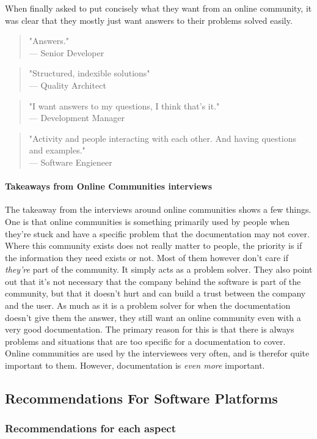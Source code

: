 \documentclass{article}
\begin{document}
When finally asked to put concisely what they want from an online community, it was clear that they mostly just want answers to their problems solved easily.
\begin{quote}
"Answers."\\
--- Senior Developer
\end{quote}
\begin{quote}
"Structured, indexible solutions"\\ --- Quality Architect
\end{quote}
\begin{quote}
"I want answers to my questions, I think that's it." \\ --- Development Manager
\end{quote}
\begin{quote}
"Activity and people interacting with each other. And having questions and examples."\\--- Software Engieneer
\end{quote}
\paragraph{Takeaways from Online Communities interviews}
The takeaway from the interviews around online communities shows a few things. One is that online communities is something primarily used by people when they're stuck and have a specific problem that the documentation may not cover. Where this community exists does not really matter to people, the priority is if the information they need exists or not. Most of them however don't care if \textit{they're} part of the community. It simply acts as a problem solver. They also point out that it's not necessary that the company behind the software is part of the community, but that it doesn't hurt and can build a trust between the company and the user. As much as it is a problem solver for when the documentation doesn't give them the answer, they still want an online community even with a very good documentation. The primary reason for this is that there is always problems and situations that are too specific for a documentation to cover. Online communities are used by the interviewees very often, and is therefor quite important to them. However, documentation is \textit{even more} important.
\subsection{Recommendations For Software Platforms}
\subsubsection{Recommendations for each aspect}
\end{document}
